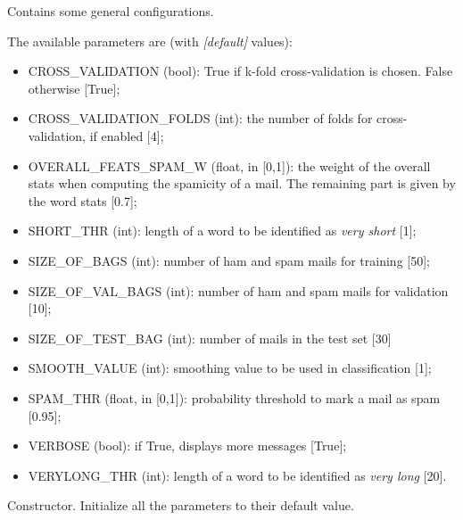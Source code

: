 \documentclass[letterpaper,10pt,english]{sphinxmanual}
\begin{document}
\begin{fulllineitems}
\label{index:config.Config}
Contains some general configurations.

The available parameters are (with \emph{{[}default{]}} values):
\begin{itemize}
\item {} 
CROSS\_VALIDATION (bool): True if k-fold cross-validation is chosen.        False otherwise {[}True{]};

\item {} 
CROSS\_VALIDATION\_FOLDS (int): the number of folds for        cross-validation, if enabled {[}4{]};

\item {} 
OVERALL\_FEATS\_SPAM\_W (float, in {[}0,1{]}): the weight of the overall stats        when computing the spamicity of a mail. The remaining part is given by        the word stats {[}0.7{]};

\item {} 
SHORT\_THR (int): length of a word to be identified as \emph{very short} {[}1{]};

\item {} 
SIZE\_OF\_BAGS (int): number of ham and spam mails for training {[}50{]};

\item {} 
SIZE\_OF\_VAL\_BAGS (int): number of ham and spam mails for validation {[}10{]};

\item {} 
SIZE\_OF\_TEST\_BAG (int): number of mails in the test set {[}30{]}

\item {} 
SMOOTH\_VALUE (int): smoothing value to be used in classification {[}1{]};

\item {} 
SPAM\_THR (float, in {[}0,1{]}): probability threshold to mark a mail as spam {[}0.95{]};

\item {} 
VERBOSE (bool): if True, displays more messages {[}True{]};

\item {} 
VERYLONG\_THR (int): length of a word to be identified as \emph{very long} {[}20{]}.

\end{itemize}

\begin{fulllineitems}
\label{index:config.Config.__init__}
Constructor. Initialize all the parameters to their default value.


\end{fulllineitems}
\end{fulllineitems}
\end{document}
